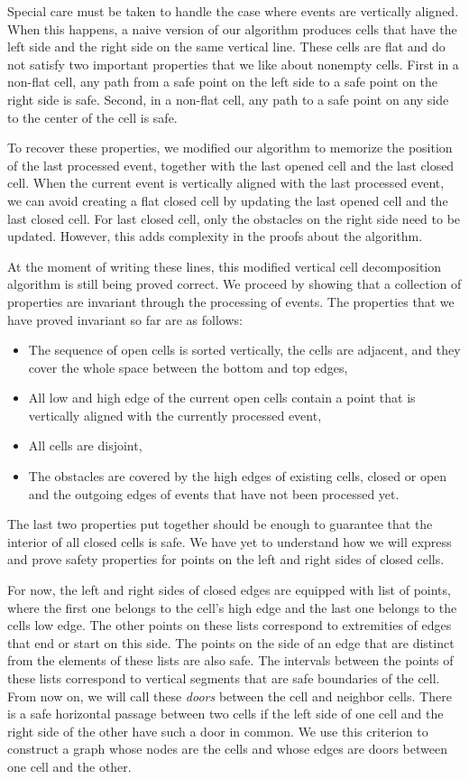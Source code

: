 \documentclass{easychair}
\begin{document}
Special care must be taken to handle the case where events are
vertically aligned.  When this happens, a naive version of our
algorithm produces cells that have the left side and the right side on the
same vertical line.  These cells are flat and do not satisfy two important
properties that we like about nonempty cells.  First in a non-flat cell,
any path from a safe point on the left side to a safe point on the
right side is safe.  Second, in a non-flat cell, any path to a safe
point on any side to the center of the cell is safe.

To recover these properties, we modified our algorithm to memorize the
position of the last processed event, together with the last opened
cell and the last closed cell.  When the current event is vertically
aligned with the last processed event, we can avoid creating a flat
closed cell by updating the last opened cell and the last closed
cell.  For last closed cell, only the obstacles on the right side need
to be updated.  However, this adds complexity in the proofs about the
algorithm.

At the moment of writing these lines, this modified vertical cell
decomposition algorithm is still being proved correct.  We proceed by
showing that a collection of properties are invariant through the
processing of events.  The properties that we have proved invariant so
far are as follows:
\begin{itemize}
\item The sequence of open cells is sorted vertically, the cells are
  adjacent, and they cover the whole space between the bottom and top
  edges,
\item All low and high edge of the current open cells contain a point
that is vertically aligned with the currently processed event,
\item All cells are disjoint,
\item The obstacles are covered by the high edges of existing cells,
  closed or open and the outgoing edges of events that have not been
  processed yet.
\end{itemize}
The last two properties put together should be enough to guarantee
that the interior of all closed cells is safe.  We have yet to
understand how we will express and prove safety properties for points
on the left and right sides of closed cells.

For now, the left and right sides of closed edges are equipped with
list of points, where the first one belongs to the cell's high edge
and the last one belongs to the cells low edge.  The other points on
these lists correspond to extremities of edges that end or start on
this side.  The points on the side of an edge that are distinct from
the elements of these lists are also safe.  The intervals between the
points of these lists correspond to vertical segments that are safe
boundaries of the cell.  From now on, we will call these {\em doors}
between the cell and neighbor cells.  There is a safe horizontal
passage between two cells if the left side of one cell and the right
side of the other have such a door in common.  We use this criterion
to construct a graph whose nodes are the cells and whose edges are
doors between one cell and the other.
\end{document}
